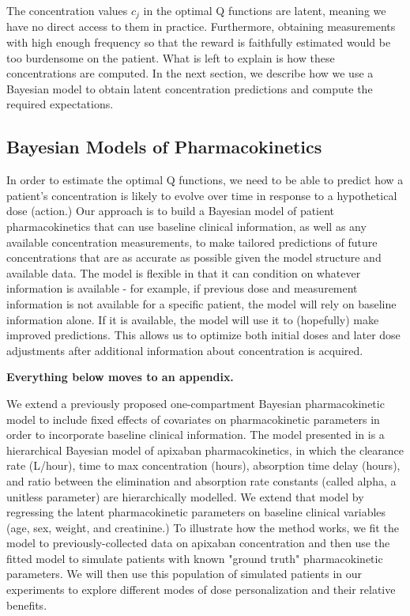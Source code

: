 The concentration values $ c_j $ in the optimal Q functions are latent, meaning we have no direct access to them in practice. Furthermore, obtaining measurements with high enough frequency so that the reward is faithfully estimated would be too burdensome on the patient. What is left to explain is how these concentrations are computed. In the next section, we describe how we use a Bayesian model  to obtain latent concentration predictions and compute the required expectations.

\subsection{Bayesian Models of Pharmacokinetics}

In order to estimate the optimal Q functions, we need to be able to predict how a patient's concentration is likely to evolve over time in response to a hypothetical dose (action.)  Our approach is to build a Bayesian model of patient pharmacokinetics that can use baseline clinical information, as well as any available concentration measurements, to make tailored predictions of future concentrations that are as accurate as possible given the model structure and available data. The model is flexible in that it can condition on whatever information is available - for example, if previous dose and measurement information is not available for a specific patient, the model will rely on baseline information alone. If it is available, the model will use it to (hopefully) make improved predictions. This allows us to optimize both initial doses and later dose adjustments after additional information about concentration is acquired.

\textbf{Everything below moves to an appendix.}

We extend a previously proposed one-compartment Bayesian pharmacokinetic model \cite{pananos2020comparisons} to include fixed effects of covariates on pharmacokinetic parameters in order to incorporate baseline clinical information.  The model presented in \cite{pananos2020comparisons} is a hierarchical Bayesian model of apixaban pharmacokinetics, in which the clearance rate (L/hour), time to max concentration (hours), absorption time delay (hours), and ratio between the elimination and absorption rate constants (called alpha, a unitless parameter) are hierarchically modelled.  We extend that model by regressing the latent pharmacokinetic parameters on baseline clinical variables (age, sex, weight, and creatinine.)  To illustrate how the method works, we fit the model to previously-collected data on apixaban concentration \cite{tirona2018apixaban} and then use the fitted model to simulate patients with known "ground truth" pharmacokinetic parameters. We will then use this population of simulated patients in our experiments to explore different modes of dose personalization and their relative benefits.

